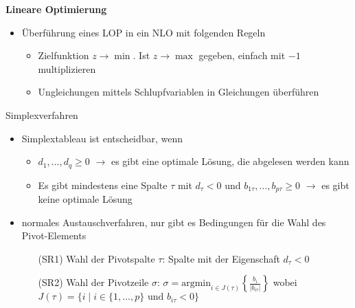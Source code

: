 \documentclass[10pt,landscape,a4paper]{article}
\begin{document}
\begin{multicols*}{4}
\begin{center}
	\normalsize{\textbf{Lineare Optimierung}} \\
\end{center}
\begin{itemize}
	\item Überführung eines LOP in ein NLO mit folgenden Regeln
	\begin{itemize}
		\item Zielfunktion $z\to\min$. Ist $z\to\max$ gegeben, einfach mit $-1$ multiplizieren
		\item Ungleichungen mittels Schlupfvariablen in Gleichungen überführen
	\end{itemize}
\end{itemize}

Simplexverfahren
\begin{itemize}
	\item Simplextableau ist entscheidbar, wenn
	\begin{itemize}
		\item $d_1,...,d_q\ge 0$ $\to$ es gibt eine optimale Lösung, die abgelesen werden kann
		\item Es gibt mindestens eine Spalte $\tau$ mit $d_\tau<0$ und $b_{1\tau},...,b_{p\tau}\ge 0$ $\to$ es gibt keine optimale Lösung
	\end{itemize}
	\item normales Austauschverfahren, nur gibt es Bedingungen für die Wahl des Pivot-Elements
	\begin{itemize}
		\setlength{\itemindent}{0.5cm}
		\item[(SR1)] Wahl der Pivotspalte $\tau$: Spalte mit der Eigenschaft $d_\tau<0$
		\item[(SR2)] Wahl der Pivotzeile $\sigma$: $\sigma=\text{argmin}_{i\in J(\tau)}\left\lbrace\frac{b_i}{\vert b_{i\tau}\vert}\right\rbrace$ wobei $J(\tau) = \{i\mid i\in\{1,...,p\}\text{ und } b_{i\tau}<0\}$
	\end{itemize}
\end{itemize}

\end{multicols*}
\end{document}

